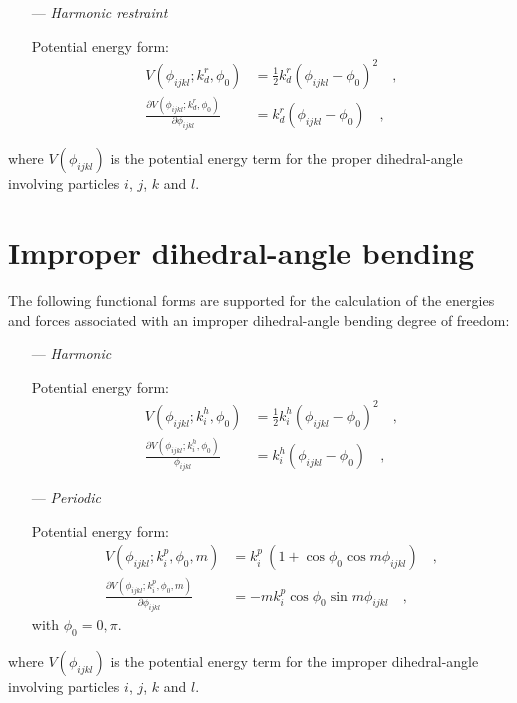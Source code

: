 \documentclass[10pt,a4paper,openany]{memoir}
\numberwithin{equation}{section}
\begin{document}
\begin{itemize}
\item [---]\textit{Harmonic restraint}
  \par
  Potential energy form:
  \begin{align}
  \label{eq:proper-restraint-energy}
  V(\phi_{ijkl}; k_d^r, \phi_0) & = \frac{1}{2} k_d^r (\phi_{ijkl} - \phi_0)^2 \quad , \\ \nonumber
  \frac{\partial V(\phi_{ijkl}; k_d^r, \phi_0)}{\partial \phi_{ijkl}} & = k_d^r (\phi_{ijkl} - \phi_0) \quad , 
\end{align}
\end{itemize}
where $V(\phi_{ijkl})$ is the potential energy term for the proper dihedral-angle involving particles $i$, $j$, $k$ and $l$.

\section{Improper dihedral-angle bending}
\label{sec:improper-terms}

The following functional forms are supported for the calculation of
the energies and forces associated with an improper dihedral-angle
bending degree of freedom:\cite{GROMOS-doc,GROMACS-doc}

\begin{itemize}
\item[---] \textit{Harmonic}
  \par
  Potential energy form:  
\begin{align}
  \label{eq:improper-harmonic-energy}
  V(\phi_{ijkl}; k_i^h, \phi_0) & =  \frac{1}{2} k_i^h (\phi_{ijkl} - \phi_0)^2 \quad , \\ \nonumber
  \frac{\partial V(\phi_{ijkl}; k_i^h, \phi_0)}{\phi_{ijkl}} & = k_i^h (\phi_{ijkl} - \phi_0) \quad ,
\end{align}
\item [---] \textit{Periodic}
  \par
  Potential energy form:
  \begin{align}
    \label{eq:improper-periodic-energy}
    V(\phi_{ijkl} ; k_{i}^p, \phi_{0}, m) & = k_{i}^p\ (1 + \cos{\phi_{0}} \cos{m \phi_{ijkl}})\quad , \\ \nonumber
    \frac{\partial V(\phi_{ijkl} ; k_{i}^p, \phi_{0}, m)}{\partial \phi_{ijkl}} & = -m k_{i}^p \cos{\phi_{0}} \sin{m \phi_{ijkl}}\quad ,
  \end{align}
  with $\phi_{0}=0,\pi$.
 \end{itemize}
 where $V(\phi_{ijkl})$ is the potential energy term for the improper dihedral-angle involving particles $i$, $j$, $k$ and $l$.
\end{document}
